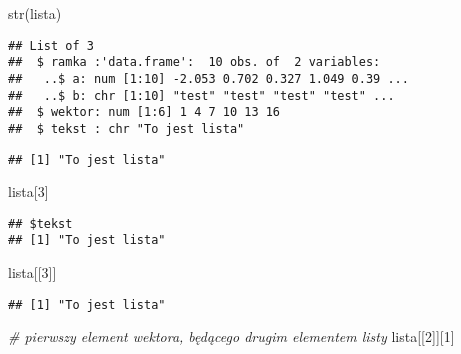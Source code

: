 \documentclass[
]{book}
\newenvironment{Shaded}{\begin{snugshade}}{\end{snugshade}}
\newcommand{\CommentTok}[1]{\textcolor[rgb]{0.56,0.35,0.01}{\textit{#1}}}
\newcommand{\DecValTok}[1]{\textcolor[rgb]{0.00,0.00,0.81}{#1}}
\newcommand{\FunctionTok}[1]{\textcolor[rgb]{0.00,0.00,0.00}{#1}}
\newcommand{\NormalTok}[1]{#1}
\newcommand{\SpecialCharTok}[1]{\textcolor[rgb]{0.00,0.00,0.00}{#1}}
\begin{document}
\begin{Shaded}
\begin{Highlighting}[]
\FunctionTok{str}\NormalTok{(lista)}
\end{Highlighting}
\end{Shaded}

\begin{verbatim}
## List of 3
##  $ ramka :'data.frame':  10 obs. of  2 variables:
##   ..$ a: num [1:10] -2.053 0.702 0.327 1.049 0.39 ...
##   ..$ b: chr [1:10] "test" "test" "test" "test" ...
##  $ wektor: num [1:6] 1 4 7 10 13 16
##  $ tekst : chr "To jest lista"
\end{verbatim}

\begin{Shaded}
\end{Shaded}

\begin{verbatim}
## [1] "To jest lista"
\end{verbatim}

\begin{Shaded}
\begin{Highlighting}[]
\NormalTok{lista[}\DecValTok{3}\NormalTok{]}
\end{Highlighting}
\end{Shaded}

\begin{verbatim}
## $tekst
## [1] "To jest lista"
\end{verbatim}

\begin{Shaded}
\begin{Highlighting}[]
\NormalTok{lista[[}\DecValTok{3}\NormalTok{]]}
\end{Highlighting}
\end{Shaded}

\begin{verbatim}
## [1] "To jest lista"
\end{verbatim}

\begin{Shaded}
\begin{Highlighting}[]
\CommentTok{\# pierwszy element wektora, będącego drugim elementem listy}
\NormalTok{lista[[}\DecValTok{2}\NormalTok{]][}\DecValTok{1}\NormalTok{]}
\end{Highlighting}
\end{Shaded}
\end{document}
